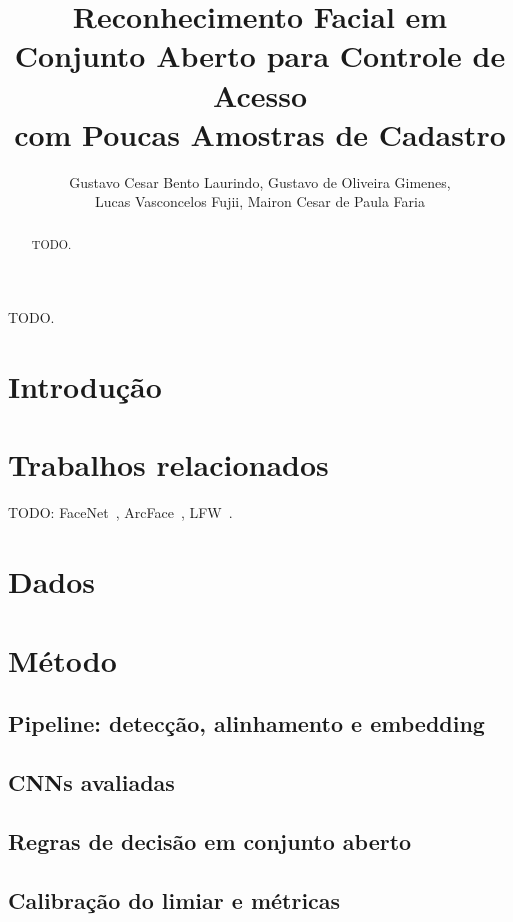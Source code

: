 \documentclass[12pt]{article}
\title{Reconhecimento Facial em Conjunto Aberto para Controle de Acesso\\com Poucas Amostras de Cadastro}
\author{Gustavo Cesar Bento Laurindo\inst{1}, Gustavo de Oliveira Gimenes\inst{1},\\ Lucas Vasconcelos Fujii\inst{1}, Mairon Cesar de Paula Faria\inst{1}}
\date{}
\begin{document}
\maketitle

\begin{abstract}
TODO.
\end{abstract}

\begin{resumo}
TODO.
\end{resumo}

\section{Introdução}

\section{Trabalhos relacionados}
TODO: FaceNet~\cite{schroff2015facenet}, ArcFace~\cite{deng2019arcface}, LFW~\cite{huang2007lfw}.

\section{Dados}

\section{Método}
\subsection{Pipeline: detecção, alinhamento e embedding}
\subsection{CNNs avaliadas}
\subsection{Regras de decisão em conjunto aberto}
\subsection{Calibração do limiar e métricas}
\end{document}
